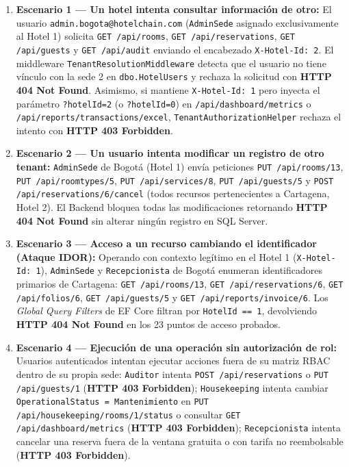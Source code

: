 \documentclass[12pt,a4paper]{article}
\begin{document}
\begin{enumerate}
    \item \textbf{Escenario 1 --- Un hotel intenta consultar informaci\'on de otro:} El usuario \texttt{admin.bogota@hotelchain.com} (\texttt{AdminSede} asignado exclusivamente al Hotel 1) solicita \texttt{GET /api/rooms}, \texttt{GET /api/reservations}, \texttt{GET /api/guests} y \texttt{GET /api/audit} enviando el encabezado \texttt{X-Hotel-Id: 2}. El middleware \texttt{TenantResolutionMiddleware} detecta que el usuario no tiene v\'inculo con la sede 2 en \texttt{dbo.HotelUsers} y rechaza la solicitud con \textbf{HTTP 404 Not Found}. Asimismo, si mantiene \texttt{X-Hotel-Id: 1} pero inyecta el par\'ametro \texttt{?hotelId=2} (o \texttt{?hotelId=0}) en \texttt{/api/dashboard/metrics} o \texttt{/api/reports/transactions/excel}, \texttt{TenantAuthorizationHelper} rechaza el intento con \textbf{HTTP 403 Forbidden}.
    \item \textbf{Escenario 2 --- Un usuario intenta modificar un registro de otro tenant:} \texttt{AdminSede} de Bogot\'a (Hotel 1) env\'ia peticiones \texttt{PUT /api/rooms/13}, \texttt{PUT /api/roomtypes/5}, \texttt{PUT /api/services/8}, \texttt{PUT /api/guests/5} y \texttt{POST /api/reservations/6/cancel} (todos recursos pertenecientes a Cartagena, Hotel 2). El Backend bloquea todas las modificaciones retornando \textbf{HTTP 404 Not Found} sin alterar ning\'un registro en SQL Server.
    \item \textbf{Escenario 3 --- Acceso a un recurso cambiando el identificador (Ataque IDOR):} Operando con contexto leg\'itimo en el Hotel 1 (\texttt{X-Hotel-Id: 1}), \texttt{AdminSede} y \texttt{Recepcionista} de Bogot\'a enumeran identificadores primarios de Cartagena: \texttt{GET /api/rooms/13}, \texttt{GET /api/reservations/6}, \texttt{GET /api/folios/6}, \texttt{GET /api/guests/5} y \texttt{GET /api/reports/invoice/6}. Los \textit{Global Query Filters} de EF Core filtran por \texttt{HotelId == 1}, devolviendo \textbf{HTTP 404 Not Found} en los 23 puntos de acceso probados.
    \item \textbf{Escenario 4 --- Ejecuci\'on de una operaci\'on sin autorizaci\'on de rol:} Usuarios autenticados intentan ejecutar acciones fuera de su matriz RBAC dentro de su propia sede: \texttt{Auditor} intenta \texttt{POST /api/reservations} o \texttt{PUT /api/guests/1} (\textbf{HTTP 403 Forbidden}); \texttt{Housekeeping} intenta cambiar \texttt{OperationalStatus = Mantenimiento} en \texttt{PUT /api/housekeeping/rooms/1/status} o consultar \texttt{GET /api/dashboard/metrics} (\textbf{HTTP 403 Forbidden}); \texttt{Recepcionista} intenta cancelar una reserva fuera de la ventana gratuita o con tarifa no reembolsable (\textbf{HTTP 403 Forbidden}).

\end{enumerate}
\end{document}
